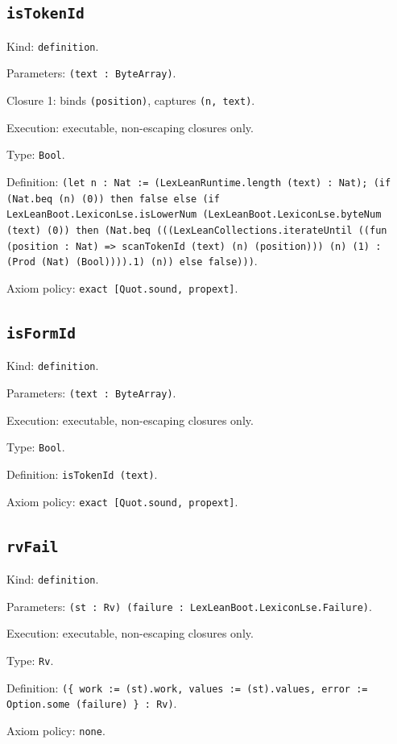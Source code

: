 \documentclass[11pt]{article}
\begin{document}
\subsection*{\texttt{isTokenId}}
\noindent Kind: \texttt{definition}.\par
\noindent Parameters: \texttt{(text : ByteArray)}.\par
\noindent Closure 1: binds \texttt{(position)}, captures \texttt{(n, text)}.\par
\noindent Execution: executable, non-escaping closures only.\par
\noindent Type: \texttt{Bool}.\par
\noindent Definition: \texttt{(let n : Nat := (LexLeanRuntime.length (text) : Nat); (if (Nat.beq (n) (0)) then false else (if LexLeanBoot.LexiconLse.isLowerNum (LexLeanBoot.LexiconLse.byteNum (text) (0)) then (Nat.beq (((LexLeanCollections.iterateUntil ((fun (position : Nat) => scanTokenId (text) (n) (position))) (n) (1) : (Prod (Nat) (Bool)))).1) (n)) else false)))}.\par
\noindent Axiom policy: \texttt{exact [Quot.sound, propext]}.\par
\subsection*{\texttt{isFormId}}
\noindent Kind: \texttt{definition}.\par
\noindent Parameters: \texttt{(text : ByteArray)}.\par
\noindent Execution: executable, non-escaping closures only.\par
\noindent Type: \texttt{Bool}.\par
\noindent Definition: \texttt{isTokenId (text)}.\par
\noindent Axiom policy: \texttt{exact [Quot.sound, propext]}.\par
\subsection*{\texttt{rvFail}}
\noindent Kind: \texttt{definition}.\par
\noindent Parameters: \texttt{(st : Rv) (failure : LexLeanBoot.LexiconLse.Failure)}.\par
\noindent Execution: executable, non-escaping closures only.\par
\noindent Type: \texttt{Rv}.\par
\noindent Definition: \texttt{(\{ work := (st).work, values := (st).values, error := Option.some (failure) \} : Rv)}.\par
\noindent Axiom policy: \texttt{none}.\par
\end{document}
